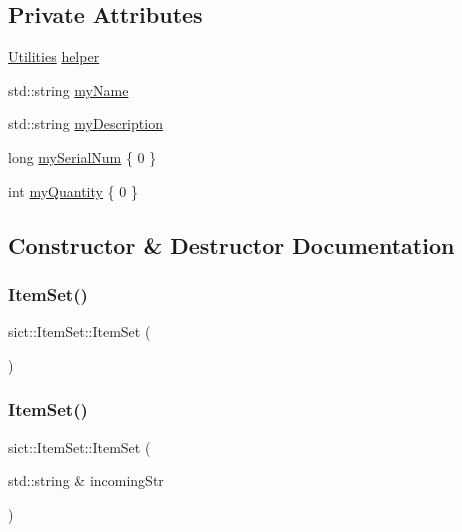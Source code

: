 \subsection*{Private Attributes}
\begin{DoxyCompactItemize}
\item 
\mbox{\hyperlink{classsict_1_1Utilities}{Utilities}} \mbox{\hyperlink{classsict_1_1ItemSet_a37d539cd68208eeb1bee50fe0c036cd2}{helper}}
\item 
std\+::string \mbox{\hyperlink{classsict_1_1ItemSet_ab6a9794c748cd4467b5f694c74ddef38}{my\+Name}}
\item 
std\+::string \mbox{\hyperlink{classsict_1_1ItemSet_ab8f1368ebbfa2607adba2949de82355c}{my\+Description}}
\item 
long \mbox{\hyperlink{classsict_1_1ItemSet_a40855b4d3e2e12b0b174669a46657c45}{my\+Serial\+Num}} \{ 0 \}
\item 
int \mbox{\hyperlink{classsict_1_1ItemSet_a49f4751c79f51768bf68def492803125}{my\+Quantity}} \{ 0 \}
\end{DoxyCompactItemize}


\subsection{Constructor \& Destructor Documentation}
\mbox{\label{classsict_1_1ItemSet_affbe4ff1fa57325fb27222d39fd780cb}} 
\subsubsection{\texorpdfstring{ItemSet()}{ItemSet()}\hspace{0.1cm}{\footnotesize\ttfamily [1/4]}}
{\footnotesize\ttfamily sict\+::\+Item\+Set\+::\+Item\+Set (\begin{DoxyParamCaption}{ }\end{DoxyParamCaption})}

\mbox{\label{classsict_1_1ItemSet_ae90c48652022bb74c04774fe0b59eadc}} 
\subsubsection{\texorpdfstring{ItemSet()}{ItemSet()}\hspace{0.1cm}{\footnotesize\ttfamily [2/4]}}
{\footnotesize\ttfamily sict\+::\+Item\+Set\+::\+Item\+Set (\begin{DoxyParamCaption}\item[{std\+::string \&}]{incoming\+Str }\end{DoxyParamCaption})}


